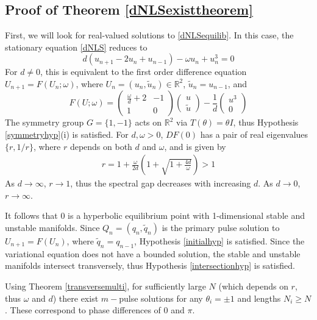 \documentclass[12pt]{article}
\def\R{{\mathbb R}}
\begin{document}
\subsection{Proof of Theorem \ref{dNLSexisttheorem}}

First, we will look for real-valued solutions to \eqref{dNLSequilib}. In this case, the stationary equation \eqref{dNLS} reduces to
\begin{equation*}
d(u_{n+1} - 2 u_n + u_{n-1}) - \omega u_n + u_n^3 = 0
\end{equation*}
For $d \neq 0$, this is equivalent to the first order difference equation $U_{n+1} = F(U_n; \omega)$, where $U_n = (u_n, \tilde{u}_n) \in \R^2$, $\tilde{u}_n = u_{n-1}$, and 
\begin{equation}\label{dnlsdiffR2}
F(U; \omega) = 
\begin{pmatrix}
\frac{\omega}{d} + 2 & -1 \\
1 & 0
\end{pmatrix}
\begin{pmatrix}
u \\ \tilde{u}
\end{pmatrix}
- \frac{1}{d} 
\begin{pmatrix}
u^3 \\ 0
\end{pmatrix}
\end{equation}
The symmetry group $G = \{ 1, -1\}$ acts on $\R^2$ via $T(\theta) = \theta I$, thus Hypothesis \ref{symmetryhyp}(i) is satisfied. For $d, \omega > 0$, $DF(0)$ has a pair of real eigenvalues $\{r, 1/r \}$, where $r$ depends on both $d$ and $\omega$, and is given by
\begin{align}\label{defr}
r = 1 + \frac{\omega}{2 d} \left( 1 + \sqrt{1 + \frac{4 d}{\omega}} \right) > 1
\end{align}
As $d \rightarrow \infty$, $r \rightarrow 1$, thus the spectral gap decreases with increasing $d$. As $d \rightarrow 0$, $r \rightarrow \infty$.

It follows that 0 is a hyperbolic equilibrium point with 1-dimensional stable and unstable manifolds. Since $Q_n = (q_n, \tilde{q}_n)$ is the primary pulse solution to $U_{n+1} = F(U_n)$, where $\tilde{q}_n = q_{n-1}$, Hypothesis \ref{initialhyp} is satisfied. Since the variational equation does not have a bounded solution, the stable and unstable manifolds intersect transversely, thus Hypothesis \ref{intersectionhyp} is satisfied. 

Using Theorem \ref{transversemulti}, for sufficiently large $N$ (which depends on $r$, thus $\omega$ and $d$) there exist $m-$pulse solutions for any $\theta_i = \pm 1$ and lengths $N_i \geq N$. These correspond to phase differences of $0$ and $\pi$.
\end{document}
